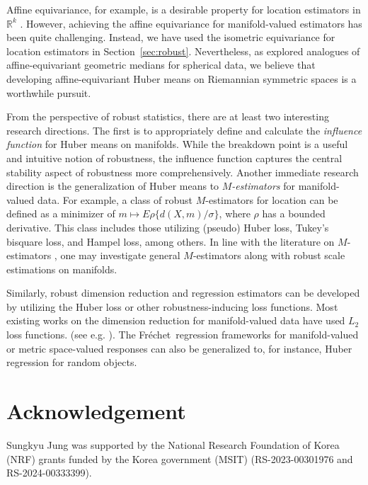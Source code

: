 \documentclass[preprint]{imsart}
\newcommand{\bbR}{\mathbb{R}}
\def\Frechet{Fr\'{e}chet}
\theoremstyle{plain}
\theoremstyle{remark}
\begin{document}
Affine equivariance, for example, is a desirable property for location estimators in $\bbR^{k}$ \citep{lopuhaa1991breakdown, scealy2021analogues}. However, achieving the affine equivariance for manifold-valued estimators has been quite challenging. Instead, we have used the isometric equivariance for location estimators in Section~\ref{sec:robust}. Nevertheless, as \cite{scealy2021analogues} explored analogues of affine-equivariant geometric medians for spherical data, we believe that developing affine-equivariant Huber means on Riemannian symmetric spaces is a worthwhile pursuit.


From the perspective of robust statistics, there are at least two interesting research directions. The first is to appropriately define and calculate the 
\textit{influence function} for Huber means on manifolds. While the breakdown point is a useful and intuitive notion of robustness, the influence function captures the central stability aspect of robustness more comprehensively. Another immediate research direction is the generalization of Huber means to \emph{$M$-estimators} for manifold-valued data. For example, a class of robust $M$-estimators for location can be defined as a minimizer of $m \mapsto E\rho\{d(X, m)/\sigma\}$, where $\rho$ has a bounded derivative. This class includes those utilizing (pseudo) Huber loss, Tukey's bisquare loss, and Hampel loss, among others. In line with the literature on $M$-estimators \citep{huber1964robust, holland1977robust, zhou2018new}, one may investigate general $M$-estimators along with robust scale estimations on manifolds.    


      

  
Similarly, robust dimension reduction and regression estimators can be developed by utilizing the Huber loss or other robustness-inducing loss functions. Most existing works on the dimension reduction for manifold-valued data have used $L_2$ loss functions. (see e.g. \cite{jung2012analysis,pennec2018barycentric}). 
The \Frechet\ regression frameworks for manifold-valued or metric space-valued responses \citep{cornea2017regression, petersen2019frechet} can also be generalized to, for instance, Huber regression for random objects.  
 


\section*{Acknowledgement}  
Sungkyu Jung was supported by the National Research Foundation of Korea (NRF) grants funded by the Korea government (MSIT) (RS-2023-00301976 and RS-2024-00333399). 
\end{document}
